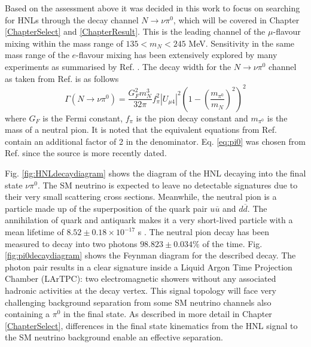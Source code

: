 Based on the assessment above it was decided in this work to focus on searching for HNLs through the decay channel $N\rightarrow\nu \pi^{0}$, which will be covered in Chapter \ref{ChapterSelect} and \ref{ChapterResult}.  
This is the leading channel of the $\mu$-flavour mixing within the mass range of $ 135 < m_{N} < 245 $ MeV.
Sensitivity in the same mass range of the $e$-flavour mixing has been extensively explored by many experiments as summarised by Ref. \cite{HNLWhitePaper}.
The decay width for the $N\rightarrow\nu \pi^{0}$ channel as taken from Ref. \cite{HNLZarko} is as follows
\begin{equation}
	\Gamma(N\rightarrow \nu \pi^{0}) = \frac{G_{F}^{2}m_{N}^{3}}{32\pi}f^{2}_{\pi}|U_{\mu4}|^{2}\left(1-\left(\frac{m_{\pi^{0}}}{m_{N}}\right)^{2}\right)^{2}
\label{eq:pi0}
\end{equation}
where $G_{F}$ is the Fermi constant, $f_{\pi}$ is the pion decay constant and $m_{\pi^{0}}$ is the mass of a neutral pion.
It is noted that the equivalent equations from Ref. \cite{SBNHNL, HNLBin} contain an additional factor of 2 in the denominator.
Eq. \ref{eq:pi0} was chosen from Ref. \cite{HNLZarko} since the source is more recently dated. 

Fig. \ref{fig:HNLdecaydiagram} shows the diagram of the HNL decaying into the final state $\nu\pi^0$.
The SM neutrino is expected to leave no detectable signatures due to their very small scattering cross sections.
Meanwhile, the neutral pion is a particle made up of the superposition of the quark pair $u\overline{u}$ and $d\overline{d}$. 
The annihilation of quark and antiquark makes it a very short-lived particle with a mean lifetime of $8.52\pm0.18 \times 10^{-17}$ s \cite{PDG}.
The neutral pion decay has been measured to decay into two photons $98.823 \pm 0.034 \%$ of the time. 
Fig. \ref{fig:pi0decaydiagram} shows the Feynman diagram for the described decay.
The photon pair results in a clear signature inside a Liquid Argon Time Projection Chamber (LArTPC): two electromagnetic showers without any associated hadronic activities at the decay vertex.
This signal topology will face very challenging background separation from some SM neutrino channels also containing a $\pi^0$ in the final state.
As described in more detail in Chapter \ref{ChapterSelect}, differences in the final state kinematics from the HNL signal to the SM neutrino background enable an effective separation.


